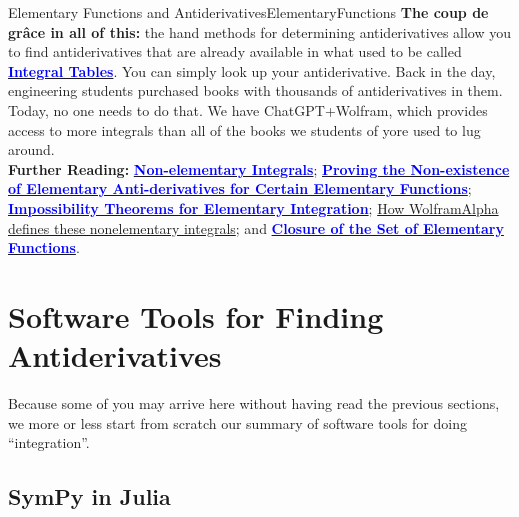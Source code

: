 \begin{funColor}{Elementary Functions and Antiderivatives}{ElementaryFunctions}
\textbf{The coup de gr\^ace in all of this:} the hand methods for determining antiderivatives allow you to find antiderivatives that are already available in what used to be called \href{https://en.wikipedia.org/wiki/Lists_of_integrals}{\textcolor{blue}{\bf Integral Tables}}. You can simply look up your antiderivative. Back in the day, engineering students purchased books with thousands of antiderivatives in them. Today, no one needs to do that. We have ChatGPT+Wolfram, which provides access to more integrals than all of the books we students of yore used to lug around.  \\


\textbf{Further Reading:} \href{https://en.wikipedia.org/wiki/Nonelementary_integral}{\textcolor{blue}{\bf Non-elementary Integrals}}; \href{http://math.uchicago.edu/~may/REU2017/REUPapers/Jayaram.pdf}{\textcolor{blue}{\bf Proving the Non-existence of Elementary Anti-derivatives for Certain Elementary Functions}}; \href{https://math.stanford.edu/~conrad/papers/elemint.pdf}{\textcolor{blue}{\bf Impossibility Theorems for Elementary Integration}}; \href{https://youtu.be/iuKJHKu2KPI}{How WolframAlpha defines these nonelementary integrals}; and 
\href{https://en.wikipedia.org/wiki/Elementary_function#:~:text=elliptic%20integral.-,Closure,-%5Bedit%5D}{\textcolor{blue}{\bf Closure of the Set of Elementary Functions}}.


\end{funColor}

\section{Software Tools for Finding Antiderivatives}

Because some of you may arrive here without having read the previous sections, we more or less start from scratch our summary of software tools for doing ``integration''.

\subsection{SymPy in Julia}

